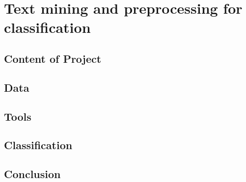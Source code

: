 


\chapter{Text mining and preprocessing for classification} \label{cha:ml3}
    \section{Content of Project} 
        \label{sec:ml3_content}
    

    \section{Data} 
        \label{sec:ml3_data}
    

    \section{Tools} %
    \label{sub:Tools}
    

    \section{Classification} %
    \label{sec:Classification}
    

    \section{Conclusion} %
    \label{sec:conclusion}
    


